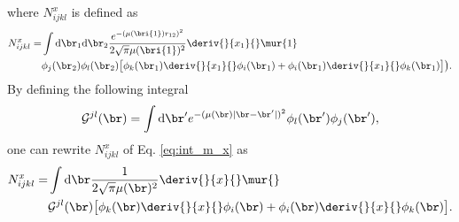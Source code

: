 where $N_{ijkl}^x $ is defined as 
\begin{equation}
 \begin{aligned}
 \label{eq:int_n_x}
  N_{ijkl}^x  = & \int \text{d}\br_1 \text{d}\br_2 \frac{e^{-(\mu(\bri{1}) r_{12})^2}}{2 \sqrt{\pi} \mu(\bri{1})^2}       \deriv{}{x_1}{} \mur{1} \\
& \phi_j(\br_2) \phi_l(\br_2) \big[ \phi_k(\br_1) \deriv{}{x_1}{} \phi_i(\br_1) + \phi_i(\br_1) \deriv{}{x_1}{} \phi_k(\br_1)  \big] \big).
 \end{aligned}
\end{equation}
By defining the following integral 
\begin{equation}
 \mathcal{G}^{jl}(\br) = \int \text{d}\br' e^{-(\mu(\br) |\br - \br'|)^2} 
                \phi_l(\br')\phi_j(\br'), 
\end{equation}
one can rewrite $N_{ijkl}^x $ of Eq. \eqref{eq:int_m_x} as 
\begin{equation}
 \begin{aligned}
  N_{ijkl}^x = & \int \text{d}\br \frac{1}{2 \sqrt{\pi} \mu(\br)^2}\deriv{}{x}{} \mur{} \\ & \mathcal{G}^{jl}(\br) \big[ \phi_k(\br) \deriv{}{x}{}\phi_i(\br) + \phi_i(\br) \deriv{}{x}{} \phi_k(\br)  \big]. 
 \end{aligned}
\end{equation}

